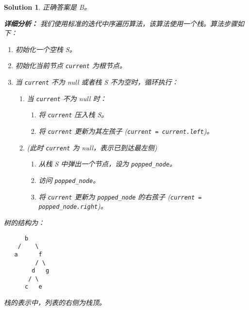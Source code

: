 \documentclass[UTF8]{report}
\newtheorem{solution}{Solution}
\theoremstyle{MyLineTheoremStyle} %
\theoremstyle{MyBlockTheoremStyle} %
\theoremstyle{MySubsubsectionStyle} %
\begin{document}
\begin{solution}
正确答案是 B。

\textbf{详细分析：}
我们使用标准的迭代中序遍历算法，该算法使用一个栈。算法步骤如下：
\begin{enumerate}
    \item 初始化一个空栈 S。
    \item 初始化当前节点 \texttt{current} 为根节点。
    \item 当 \texttt{current} 不为 null 或者栈 S 不为空时，循环执行：
    \begin{enumerate}
        \item 当 \texttt{current} 不为 null 时：
        \begin{enumerate}
            \item 将 \texttt{current} 压入栈 S。
            \item 将 \texttt{current} 更新为其左孩子 (\texttt{current = current.left})。
        \end{enumerate}
        \item (此时 \texttt{current} 为 null，表示已到达最左侧)
        \begin{enumerate}
            \item 从栈 S 中弹出一个节点，设为 \texttt{popped\_node}。
            \item 访问 \texttt{popped\_node}。
            \item 将 \texttt{current} 更新为 \texttt{popped\_node} 的右孩子 (\texttt{current = popped\_node.right})。
        \end{enumerate}
    \end{enumerate}
\end{enumerate}

树的结构为：
\begin{verbatim}
      b
    /    \
   a      f
         / \
        d   g
       / \
      c   e
\end{verbatim}
栈的表示中，列表的右侧为栈顶。


\end{solution}
\end{document}
